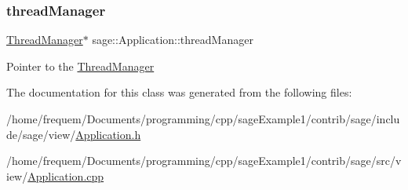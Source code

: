 \subsubsection{\texorpdfstring{threadManager}{threadManager}}
{\footnotesize\ttfamily \mbox{\hyperlink{classsage_1_1ThreadManager}{Thread\+Manager}}$\ast$ sage\+::\+Application\+::thread\+Manager\hspace{0.3cm}{\ttfamily [protected]}}

Pointer to the \mbox{\hyperlink{classsage_1_1ThreadManager}{Thread\+Manager}} 

The documentation for this class was generated from the following files\+:\begin{DoxyCompactItemize}
\item 
/home/frequem/\+Documents/programming/cpp/sage\+Example1/contrib/sage/include/sage/view/\mbox{\hyperlink{Application_8h}{Application.\+h}}\item 
/home/frequem/\+Documents/programming/cpp/sage\+Example1/contrib/sage/src/view/\mbox{\hyperlink{Application_8cpp}{Application.\+cpp}}\end{DoxyCompactItemize}
